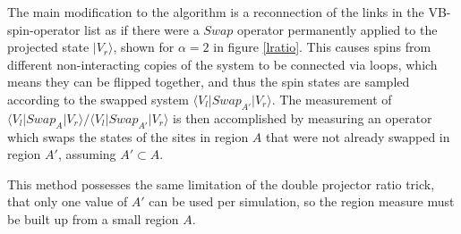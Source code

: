 \documentclass[prb,aps,twocolumn,floatfix,amsmath,amssymb,superscriptaddress,tightenlines]{revtex4}
\begin{document}
The main modification to the algorithm is a reconnection of the links in the VB-spin-operator list as if there were a $Swap$ operator permanently applied to the projected state $\lvert V_r \rangle$, shown for $\alpha = 2$ in figure \ref{lratio}.
This causes spins from different non-interacting copies of the system to be connected via loops, which means they can be flipped together, and thus the spin states are sampled according to the swapped system $\langle V_l  \lvert Swap_{A'} \lvert V_r\rangle$.
The measurement of  $\langle V_l  \lvert Swap_{A} \lvert V_r\rangle/\langle V_l  \lvert Swap_{A'} \lvert V_r\rangle$ is then accomplished by measuring an operator which swaps the states of the sites in region $A$ that were not already swapped in region $A'$, assuming $A' \subset A$.

This method possesses the same limitation of the double projector ratio trick, that only one value of $A'$ can be used per simulation, so the region measure must be built up from a small region $A$.


\end{document}
